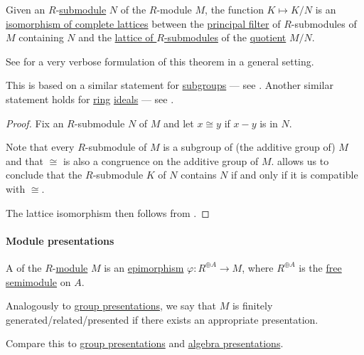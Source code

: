 \begin{theorem}\label{thm:lattice_theorem_for_submodules}
  Given an \( R \)-\hyperref[def:module/submodel]{submodule} \( N \) of the \( R \)-module \( M \), the function \( K \mapsto K / N \) is an \hyperref[def:semilattice/homomorphism]{isomorphism of complete lattices} between the \hyperref[def:lattice_ideal/principal]{principal filter} of \( R \)-submodules of \( M \) containing \( N \) and the \hyperref[thm:semiring_of_ideals/lattice]{lattice of \( R \)-submodules} of the \hyperref[def:module/quotient]{quotient} \( M / N \).
\end{theorem}
\begin{comments}
  \item See  for a very verbose formulation of this theorem in a general setting.

  \item This is based on a similar statement for \hyperref[def:group/submodel]{subgroups} --- see . Another similar statement holds for \hyperref[def:ring]{ring} \hyperref[def:semiring_ideal]{ideals} --- see .
\end{comments}
\begin{proof}
  Fix an \( R \)-submodule \( N \) of \( M \) and let \( x \cong y \) if \( x - y \) is in \( N \).

  Note that every \( R \)-submodule of \( M \) is a subgroup of (the additive group of) \( M \) and that \( {\cong} \) is also a congruence on the additive group of \( M \).  allows us to conclude that the \( R \)-submodule \( K \) of \( N \) contains \( N \) if and only if it is compatible with \( {\cong} \).

  The lattice isomorphism then follows from .
\end{proof}

\paragraph{Module presentations}

\begin{definition}\label{def:module_presentation}\mimprovised
  A  of the \( R \)-\hyperref[def:module]{module} \( M \) is an \hyperref[def:module/homomorphism]{epimorphism} \( \varphi: R^{\oplus A} \to M \), where \( R^{\oplus A} \) is the \hyperref[def:free_semimodule]{free semimodule} on \( A \).

  Analogously to \hyperref[def:group_presentation]{group presentations}, we say that \( M \) is finitely generated/related/presented if there exists an appropriate presentation.
\end{definition}
\begin{comments}
  \item Compare this to \hyperref[def:group_presentation]{group presentations} and \hyperref[def:algebra_presentation]{algebra presentations}.
\end{comments}

